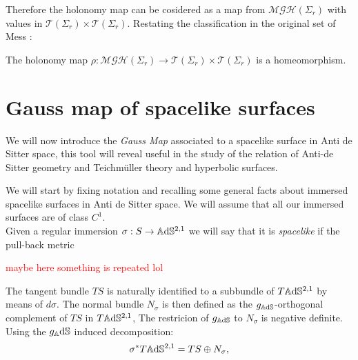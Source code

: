 Therefore the holonomy map can be cosidered as a map from $ \mathcal{MGH}(\Sigma_r)$ with values in $\mathcal{T}(\Sigma_r)\times\mathcal{T}(\Sigma_r).$ Restating the classification in the original set of Mess \cite{Mess}: 
\begin{theorem}
    The holonomy map $\rho:\mathcal{MGH}(\Sigma_r)\to\mathcal{T}(\Sigma_r)\times\mathcal{T}(\Sigma_r)$ is a homeomorphism.
\end{theorem}
\section{Gauss map of spacelike surfaces}
    We will now introduce the \textit{Gauss Map} associated to a spacelike surface in Anti de Sitter space, this tool will reveal useful in the study of the relation of Anti-de Sitter geometry and Teichm\"uller theory and hyperbolic surfaces.

    We will start by fixing notation and recalling some general facts about immersed spacelike surfaces in Anti de Sitter space. We will assume that all our immersed surfaces are of class $C^1$. \\
    Given a regular immersion $\sigma: S\to\mathbb{A}\mathrm{d}\mathbb{S}^{2,1}$ we will say that it is \textit{spacelike} if the pull-back metric  


\textcolor{red}{maybe here something is repeated lol}

The tangent bundle $TS$ is naturally identified to a subbundle of $T\mathbb{A}\mathrm{d}\mathbb{S}^{2,1}$ by means of $d\sigma$. The normal bundle $N_\sigma$ is then defined as the $g_{\mathbb{A}\mathrm{d}\mathbb{S}}$-orthogonal complement of $TS$ in $T\mathbb{A}\mathrm{d}\mathbb{S}^{2,1}$, The restricion of $g_{\mathbb{A}\mathrm{d}\mathbb{S}}$ to $N_\sigma$ is negative definite. Using the $g_\mathbb{A}\mathrm{d}\mathbb{S}$ induced decomposition: 
\[
\sigma^*T\mathbb{A}\mathrm{d}\mathbb{S}^{2,1}=TS\oplus N_\sigma,    
\]

